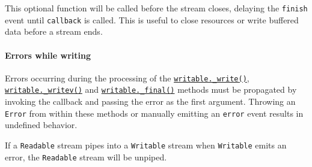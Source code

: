 This optional function will be called before the stream closes, delaying
the \texttt{\textquotesingle{}finish\textquotesingle{}} event until
\texttt{callback} is called. This is useful to close resources or write
buffered data before a stream ends.

\paragraph{Errors while writing}\label{errors-while-writing}

Errors occurring during the processing of the
\hyperref[writable_writechunk-encoding-callback]{\texttt{writable.\_write()}},
\hyperref[writable_writevchunks-callback]{\texttt{writable.\_writev()}}
and \hyperref[writable_finalcallback]{\texttt{writable.\_final()}}
methods must be propagated by invoking the callback and passing the
error as the first argument. Throwing an \texttt{Error} from within
these methods or manually emitting an
\texttt{\textquotesingle{}error\textquotesingle{}} event results in
undefined behavior.

If a \texttt{Readable} stream pipes into a \texttt{Writable} stream when
\texttt{Writable} emits an error, the \texttt{Readable} stream will be
unpiped.

\begin{Shaded}
\begin{Highlighting}[]
\OperatorTok{=} \NormalTok{(}\NormalTok{)}\OperatorTok{;}

\OperatorTok{=}  \NormalTok{(\{}
  \OperatorTok{,}\OperatorTok{,}
    \NormalTok{()}\NormalTok{(}\NormalTok{) }\OperatorTok{\textgreater{}=} \NormalTok{) \{}
      \NormalTok{(} \NormalTok{(}\NormalTok{))}\OperatorTok{;}
\NormalTok{    \} }\NormalTok{ \{}
      \NormalTok{()}\OperatorTok{;}
\NormalTok{    \}}
\NormalTok{  \}}\OperatorTok{,}
\NormalTok{\})}\OperatorTok{;}
\end{Highlighting}
\end{Shaded}

